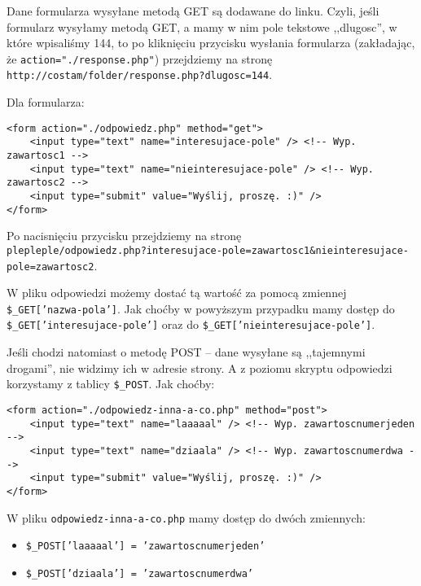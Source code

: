 \documentclass [a4paper, 10pt, oneside]{article}
\begin{document}
Dane formularza wysyłane metodą GET są dodawane do linku. Czyli, jeśli formularz wysyłamy metodą GET, a mamy w nim pole tekstowe ,,dlugosc'', w które wpisaliśmy 144, to po kliknięciu przycisku wysłania formularza (zakładając, że \texttt{action="./response.php"}) przejdziemy na stronę\\ \texttt{http://costam/folder/response.php?dlugosc=144}.

Dla formularza:
\begin{verbatim}
<form action="./odpowiedz.php" method="get">
    <input type="text" name="interesujace-pole" /> <!-- Wyp. zawartosc1 -->
    <input type="text" name="nieinteresujace-pole" /> <!-- Wyp. zawartosc2 -->
    <input type="submit" value="Wyślij, proszę. :)" />
</form>
\end{verbatim}
Po nacisnięciu przycisku przejdziemy na stronę\\
\texttt{plepleple/odpowiedz.php?interesujace-pole=zawartosc1\&nieinteresujace-pole=zawartosc2}.

W pliku odpowiedzi możemy dostać tą wartość za pomocą zmiennej \texttt{\$\_GET['nazwa-pola']}. Jak choćby w powyższym przypadku mamy dostęp do \texttt{\$\_GET['interesujace-pole']} oraz do \texttt{\$\_GET['nieinteresujace-pole']}.

Jeśli chodzi natomiast o metodę POST -- dane wysyłane są ,,tajemnymi drogami'', nie widzimy ich w adresie strony. A z poziomu skryptu odpowiedzi korzystamy z tablicy \texttt{\$\_POST}. Jak choćby:
\begin{verbatim}
<form action="./odpowiedz-inna-a-co.php" method="post">
    <input type="text" name="laaaaal" /> <!-- Wyp. zawartoscnumerjeden -->
    <input type="text" name="dziaala" /> <!-- Wyp. zawartoscnumerdwa -->
    <input type="submit" value="Wyślij, proszę. :)" />
</form>
\end{verbatim}
W pliku \texttt{odpowiedz-inna-a-co.php} mamy dostęp do dwóch zmiennych:
\begin{itemize}
    \item \texttt{\$\_POST['laaaaal'] = 'zawartoscnumerjeden'}
    \item \texttt{\$\_POST['dziaala'] = 'zawartoscnumerdwa'}
\end{itemize}
\end{document}
